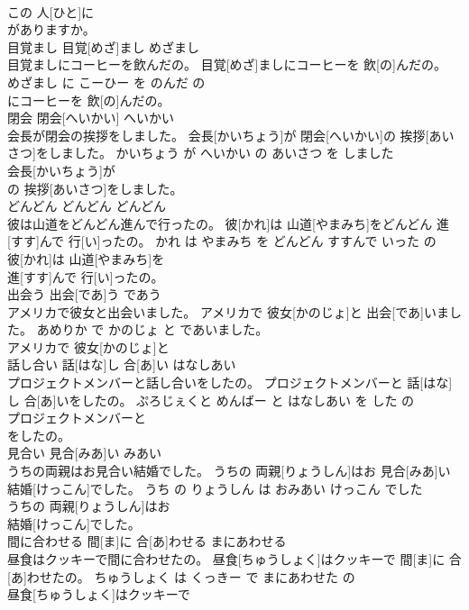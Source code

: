 \documentclass[8pt]{extreport}
\begin{document}
\begin{CJK}{UTF8}{min}
\\	この 人[ひと]に
\\	がありますか。			
\\	目覚まし	目覚[めざ]まし	めざまし	
\\	目覚ましにコーヒーを飲んだの。	目覚[めざ]ましにコーヒーを 飲[の]んだの。	めざまし に こーひー を のんだ の	
\\	にコーヒーを 飲[の]んだの。			
\\	閉会	閉会[へいかい]	へいかい	
\\	会長が閉会の挨拶をしました。	会長[かいちょう]が 閉会[へいかい]の 挨拶[あいさつ]をしました。	かいちょう が へいかい の あいさつ を しました	
\\	会長[かいちょう]が
\\	の 挨拶[あいさつ]をしました。			
\\	どんどん	どんどん	どんどん	
\\	彼は山道をどんどん進んで行ったの。	彼[かれ]は 山道[やまみち]をどんどん 進[すす]んで 行[い]ったの。	かれ は やまみち を どんどん すすんで いった の	
\\	彼[かれ]は 山道[やまみち]を
\\	進[すす]んで 行[い]ったの。			
\\	出会う	出会[であ]う	であう	
\\	アメリカで彼女と出会いました。	アメリカで 彼女[かのじょ]と 出会[であ]いました。	あめりか で かのじょ と であいました。	
\\	アメリカで 彼女[かのじょ]と
\\	話し合い	話[はな]し 合[あ]い	はなしあい	
\\	プロジェクトメンバーと話し合いをしたの。	プロジェクトメンバーと 話[はな]し 合[あ]いをしたの。	ぷろじぇくと めんばー と はなしあい を した の	
\\	プロジェクトメンバーと
\\	をしたの。			
\\	見合い	見合[みあ]い	みあい	
\\	うちの両親はお見合い結婚でした。	うちの 両親[りょうしん]はお 見合[みあ]い 結婚[けっこん]でした。	うち の りょうしん は おみあい けっこん でした	
\\	うちの 両親[りょうしん]はお
\\	結婚[けっこん]でした。			
\\	間に合わせる	間[ま]に 合[あ]わせる	まにあわせる	
\\	昼食はクッキーで間に合わせたの。	昼食[ちゅうしょく]はクッキーで 間[ま]に 合[あ]わせたの。	ちゅうしょく は くっきー で まにあわせた の	
\\	昼食[ちゅうしょく]はクッキーで

\end{CJK}
\end{document}
